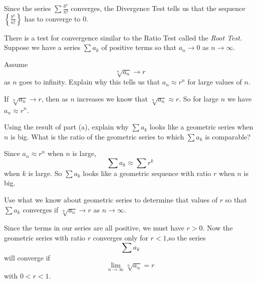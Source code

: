 \begin{exercises}
\begin{exerciseSolution}

\solution Since the series $\sum \frac{b^n}{n!}$ converges, the Divergence Test tells us that the sequence $\left\{\frac{b^n}{n!}\right\}$ has to converge to 0.

\end{exerciseSolution}

\ea

  \item \label{ex:8.3_Root_Test} There is a test for convergence similar to the Ratio Test called the \emph{Root Test}. Suppose we have a series $ \sum a_k$ of positive terms so that $a_n \to 0$ as $n \to \infty$.
  \ba
  \item Assume
  \[\sqrt[n]{a_n} \to r\]
as $n$ goes to infinity. Explain why this tells us that $a_n \approx r^n$ for large values of $n$.

\begin{exerciseSolution}

If $\sqrt[n]{a_n} \to r$, then as $n$ increases we know that $\sqrt[n]{a_n} \approx r$. So for large $n$ we have $a_n \approx r^n$.

\end{exerciseSolution}

\item Using the result of part (a), explain why $\sum a_k$ looks like a geometric series when $n$ is big. What is the ratio of the geometric series to which $\sum a_k$ is comparable?

\begin{exerciseSolution}

Since $a_n \approx r^n$ when $n$ is large,
\[\sum a_k \approx \sum r^k\]
when $k$ is large. So $\sum a_k$ looks like a geometric sequence with ratio $r$ when $n$ is big.

\end{exerciseSolution}

\item Use what we know about geometric series to determine that values of $r$ so that $\sum a_k$ converges if $\sqrt[n]{a_n} \to r$ as $n \to \infty$.

\begin{exerciseSolution}

Since the terms in our series are all positive, we must have $r > 0$.  Now the geometric series with ratio $r$ converges only for $r < 1$,so the series
\[\sum a_k\]
will converge if
\[\lim_{n \to \infty} \sqrt[n]{a_n} = r\]
with $0 < r < 1$.


\end{exerciseSolution}
\end{exercises}
